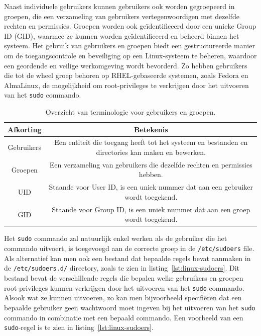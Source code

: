 Naast individuele gebruikers kunnen gebruikers ook worden gegroepeerd in groepen, die een verzameling van gebruikers vertegenwoordigen met dezelfde rechten en permissies.
Groepen worden ook ge\"identificeerd door een unieke Group ID (GID), waarmee ze kunnen worden ge\"identificeerd en beheerd binnen het systeem.
Het gebruik van gebruikers en groepen biedt een gestructureerde manier om de toegangscontrole en beveiliging op een Linux-systeem te beheren, waardoor een geordende en veilige werkomgeving wordt bevorderd.
Zo hebben gebruikers die tot de wheel groep behoren op RHEL-gebaseerde systemen, zoals Fedora en AlmaLinux, de mogelijkheid om root-privileges te verkrijgen door het uitvoeren van het \texttt{sudo} commando.

\begin{table}[!h]
    \begin{adjustbox}{width=1\textwidth}
        \begin{tabular}{ c c  }
            \hline
                Afkorting & Betekenis\\ [0.5ex] 
            \hline
                Gebruikers & Een entiteit die toegang heeft tot het systeem en bestanden en directories kan maken en bewerken. \\
                Groepen    & Een verzameling van gebruikers die dezelfde rechten en permissies hebben. \\
                UID        & Staande voor User ID, is een uniek nummer dat aan een gebruiker wordt toegekend. \\
                GID        & Staande voor Group ID, is een uniek nummer dat aan een groep wordt toegekend. \\
        \end{tabular}
    \end{adjustbox}
    \caption{Overzicht van terminologie voor gebruikers en groepen.}
    \label{table:user-group-terminology}
\end{table}

Het \texttt{sudo} commando zal natuurlijk enkel werken als de gebruiker die het commando uitvoert, is toegevoegd aan de correcte groep in de \texttt{/etc/sudoers} file.
Als alternatief kan men ook een bestand dat bepaalde regels bevat aanmaken in de \texttt{/etc/sudoers.d/} directory, zoals te zien in listing~\ref{lst:linux-sudoers}.
Dit bestand bevat de verschillende regels die bepalen welke gebruikers en groepen root-privileges kunnen verkrijgen door het uitvoeren van het \texttt{sudo} commando.
Alsook wat ze kunnen uitvoeren, zo kan men bijvoorbeeld specifi\"eren dat een bepaalde gebruiker geen wachtwoord moet ingeven bij het uitvoeren van het \texttt{sudo} commando in combinatie met een bepaald commando.
Een voorbeeld van een \texttt{sudo}-regel is te zien in listing~\ref{lst:linux-sudoers}.


